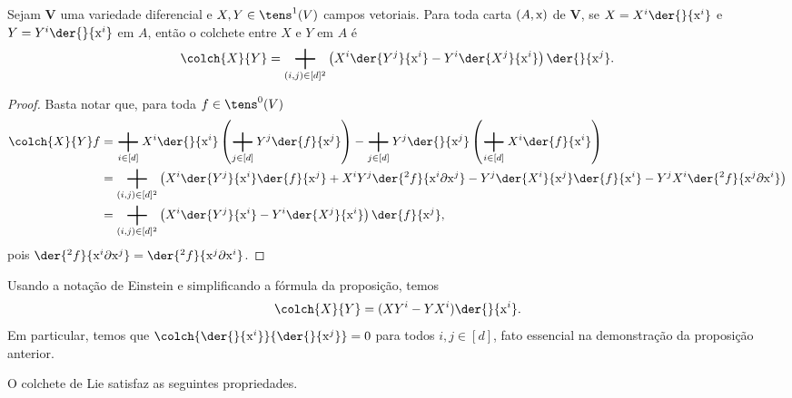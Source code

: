 \begin{prop}
Sejam $\bm V$ uma variedade diferencial e $X,Y \in \tens^1(V)$ campos vetoriais. Para toda carta $(A,\mathrm{x})$ de $\bm V$, se $X = X^i \der{}{\x^i}$ e $Y = Y^i \der{}{\x^i}$ em $A$, então o colchete entre $X$ e $Y$ em $A$ é
	\begin{equation*}
	\colch{X}{Y} = \sum_{(i,j) \in [d]^2} \left(X^i\der{Y^j}{\x^i} -  Y^i\der{X^j}{\x^i}\right) \der{}{\x^j}.
	\end{equation*}
\end{prop}
\begin{proof}
Basta notar que, para toda $f \in \tens^0(V)$
	\begin{align*}
	\colch{X}{Y}f &= \sum_{i \in [d]} X^i \der{}{\x^i} \left( \sum_{j \in [d]} Y^j \der{f}{\x^j} \right) - \sum_{j \in [d]} Y^j \der{}{\x^j} \left( \sum_{i \in [d]} X^i \der{f}{\x^i} \right) \\
		&= \sum_{(i,j) \in [d]^2} \left( X^i \der{Y^j}{\x^i}\der{f}{\x^j} + X^iY^j \der{^2 f}{\x^i \partial \x^j} - Y^j \der{X^i}{\x^j}\der{f}{\x^i} - Y^jX^i \der{^2 f}{\x^j \partial \x^i} \right)\\
		&= \sum_{(i,j) \in [d]^2} \left(X^i\der{Y^j}{\x^i} -  Y^i\der{X^j}{\x^i}\right) \der{f}{\x^j},
	\end{align*}
pois $\der{^2 f}{\x^i \partial \x^j} = \der{^2 f}{\x^j \partial \x^i}$.
\end{proof}

Usando a notação de Einstein e simplificando a fórmula da proposição, temos
	\begin{equation*}
	\colch{X}{Y} = (XY^i - YX^i)\der{}{\x^i}.
	\end{equation*}
Em particular, temos que $\colch{\der{}{\x^i}}{\der{}{\x^j}} = 0$ para todos $i,j \in [d]$, fato essencial na demonstração da proposição anterior.

O colchete de Lie satisfaz as seguintes propriedades.

